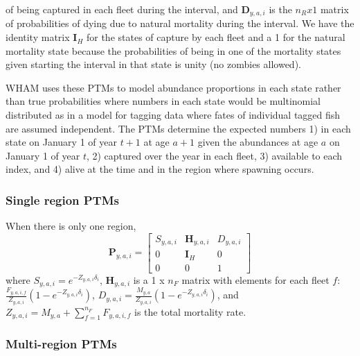 \documentclass[
]{article}
\begin{document}
of being captured in each fleet during the interval, and
\(\mathbf{D}_{y,a,i}\) is the \(n_R x 1\) matrix of probabilities of
dying due to natural mortality during the interval. We have the identity
matrix \(\mathbf{I}_{H}\) for the states of capture by each fleet and a
1 for the natural mortality state because the probabilities of being in
one of the mortality states given starting the interval in that state is
unity (no zombies allowed).

WHAM uses these PTMs to model abundance proportions in each state rather
than true probabilities where numbers in each state would be multinomial
distributed as in a model for tagging data where fates of individual
tagged fish are assumed independent. The PTMs determine the expected
numbers 1) in each state on January 1 of year \(t+1\) at age \(a+1\)
given the abundances at age \(a\) on January 1 of year \(t\), 2)
captured over the year in each fleet, 3) available to each index, and 4)
alive at the time and in the region where spawning occurs.

\hypertarget{single-region-ptms}{%
\subsubsection*{Single region PTMs}\label{single-region-ptms}}

When there is only one region, \begin{equation}\label{eq:ptm_1_region}
\mathbf{P}_{y,a,i} = 
  \begin{bmatrix}
     S_{y,a,i} & \mathbf{H}_{y,a,i} & D_{y,a,i} \\
     0 & \mathbf{I}_{H} & 0\\
     0 & 0 & 1
  \end{bmatrix}
\end{equation} where \(S_{y,a,i} = e^{-Z_{y,a,i}\delta_i}\),
\(\mathbf{H}_{y,a,i}\) is a 1 x \(n_F\) matrix with elements for each
fleet \(f\):
\(\frac{F_{y,a,i,f}}{Z_{y,a,i}}\left(1 - e^{-Z_{y,a,i}\delta_i}\right)\),
\(D_{y,a,i} = \frac{M_{y,a}}{Z_{y,a,i}}\left(1 - e^{-Z_{y,a,i}\delta_i}\right)\),
and \(Z_{y,a,i} = M_{y,a} + \sum^{n_F}_{f=1} F_{y,a,i,f}\) is the total
mortality rate.

\hypertarget{multi-region-ptms}{%
\subsubsection*{Multi-region PTMs}\label{multi-region-ptms}}
\end{document}
